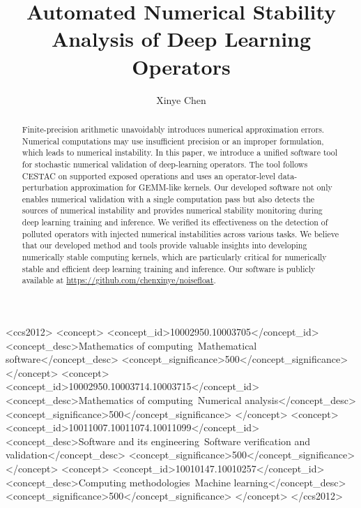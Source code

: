 \documentclass[manuscript, screen]{acmart}
\def\shortauthors{}
\begin{document}
\title{Automated Numerical Stability Analysis of Deep Learning Operators}
\author{Xinye Chen}

\renewcommand{\shortauthors}{Chen}

\begin{abstract}
Finite-precision arithmetic unavoidably introduces numerical approximation errors. Numerical computations may use insufficient precision or an improper formulation, which leads to numerical instability.  In this paper, we introduce a unified software tool for stochastic numerical validation of deep-learning operators. The tool follows CESTAC on supported exposed operations and uses an operator-level data-perturbation approximation for GEMM-like kernels. Our developed software not only enables numerical validation with a single computation pass but also detects the sources of numerical instability and provides numerical stability monitoring during deep learning training and inference. We verified its effectiveness on the detection of polluted operators with injected numerical instabilities across various tasks. We believe that our developed method and tools provide valuable insights into developing numerically stable computing kernels, which are particularly critical for numerically stable and efficient deep learning training and inference. Our software is publicly available at \url{https://github.com/chenxinye/noisefloat}. 
\end{abstract}

\begin{CCSXML}
<ccs2012>
   <concept>
       <concept_id>10002950.10003705</concept_id>
       <concept_desc>Mathematics of computing~Mathematical software</concept_desc>
       <concept_significance>500</concept_significance>
       </concept>
   <concept>
       <concept_id>10002950.10003714.10003715</concept_id>
       <concept_desc>Mathematics of computing~Numerical analysis</concept_desc>
       <concept_significance>500</concept_significance>
       </concept>
   <concept>
       <concept_id>10011007.10011074.10011099</concept_id>
       <concept_desc>Software and its engineering~Software verification and validation</concept_desc>
       <concept_significance>500</concept_significance>
       </concept>
   <concept>
       <concept_id>10010147.10010257</concept_id>
       <concept_desc>Computing methodologies~Machine learning</concept_desc>
       <concept_significance>500</concept_significance>
       </concept>
 </ccs2012>
\end{CCSXML}
\end{document}
